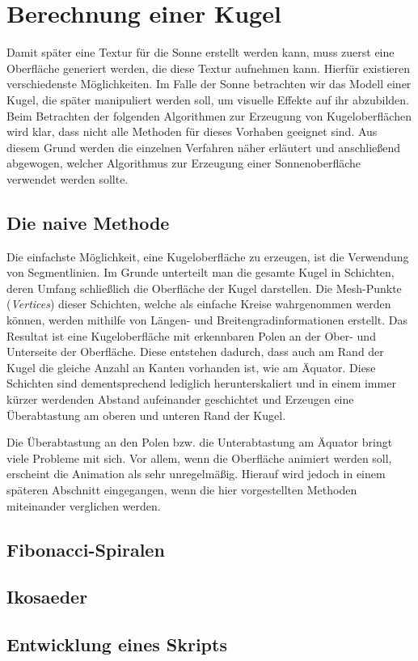 \section{Berechnung einer Kugel}
Damit später eine Textur für die Sonne erstellt werden kann, muss zuerst eine
Oberfläche generiert werden, die diese Textur aufnehmen kann. Hierfür existieren
verschiedenste Möglichkeiten. Im Falle der Sonne betrachten wir das Modell einer
Kugel, die später manipuliert werden soll, um visuelle Effekte auf ihr
abzubilden. Beim Betrachten der folgenden Algorithmen zur Erzeugung von
Kugeloberflächen wird klar, dass nicht alle Methoden für dieses Vorhaben
geeignet sind. Aus diesem Grund werden die einzelnen Verfahren näher erläutert
und anschließend abgewogen, welcher Algorithmus zur Erzeugung einer
Sonnenoberfläche verwendet werden sollte.

\subsection{Die naive Methode}
Die einfachste Möglichkeit, eine Kugeloberfläche zu erzeugen, ist die Verwendung
von Segmentlinien. Im Grunde unterteilt man die gesamte Kugel in Schichten,
deren Umfang schließlich die Oberfläche der Kugel darstellen. Die Mesh-Punkte
(\textit{Vertices}) dieser Schichten, welche als einfache Kreise wahrgenommen
werden können, werden mithilfe von Längen- und Breitengradinformationen
erstellt. Das Resultat ist eine Kugeloberfläche mit erkennbaren Polen an der
Ober- und Unterseite der Oberfläche. Diese entstehen dadurch, dass auch am Rand
der Kugel die gleiche Anzahl an Kanten vorhanden ist, wie am Äquator. Diese
Schichten sind dementsprechend lediglich herunterskaliert und in einem immer
kürzer werdenden Abstand aufeinander geschichtet und Erzeugen eine Überabtastung
am oberen und unteren Rand der Kugel.

Die Überabtastung an den Polen bzw. die Unterabtastung am Äquator bringt viele
Probleme mit sich. Vor allem, wenn die Oberfläche animiert werden soll,
erscheint die Animation als sehr unregelmäßig. Hierauf wird jedoch in einem
späteren Abschnitt eingegangen, wenn die hier vorgestellten Methoden miteinander
verglichen werden.

\subsection{Fibonacci-Spiralen}
\subsection{Ikosaeder}
\subsection{Entwicklung eines Skripts}
